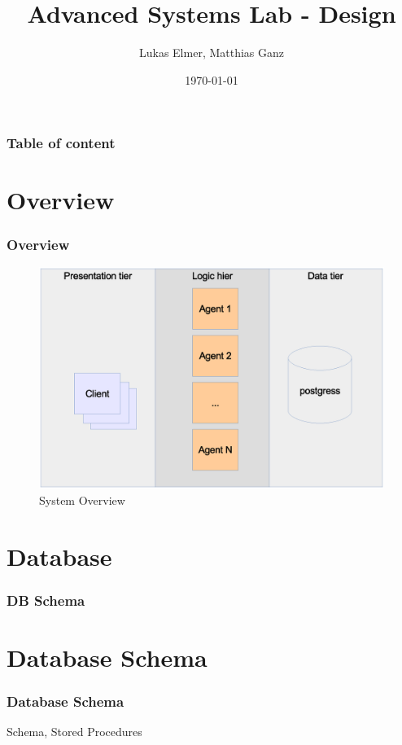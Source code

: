 \documentclass{beamer}
\title{Advanced Systems Lab - Design}
\author{Lukas Elmer, Matthias Ganz}
\date{\today}
\begin{document}
\begin{frame}
\titlepage
\end{frame} 

\begin{frame}
\frametitle{Table of content}
\tableofcontents
\end{frame} 



\section{Overview}
\begin{frame}
\frametitle{Overview}


\begin{figure}
  \begin{center}
    \includegraphics[scale=0.3]{../../drawings/system-overview.eps}
  \end{center}
  \caption{System Overview}
  \label{fig:system-overview}
\end{figure}

\end{frame}

\section{Database}
\begin{frame}
\frametitle{DB Schema}

\end{frame}


\section{Database Schema}
\begin{frame}
\frametitle{Database Schema}
Schema, Stored Procedures
\end{frame}
\end{document}
